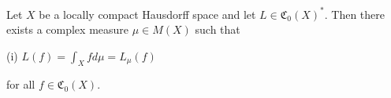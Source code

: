 Let $X$ be a locally compact Hausdorff space and let $L \in \mathfrak{C}_0(X)^*$. Then there exists a complex measure $\mu \in M(X)$ such that

(i) $L(f) = \int_X f d\mu = L_\mu(f)$

for all $f \in \mathfrak{C}_0(X)$.